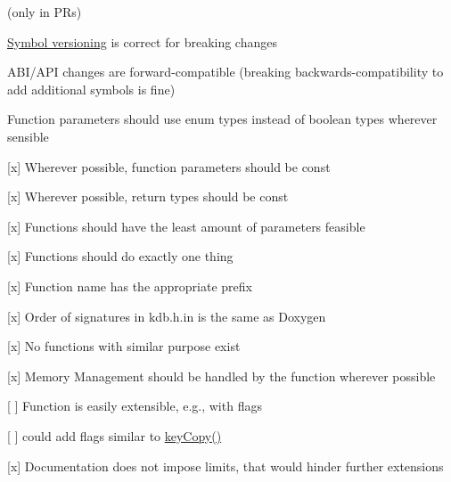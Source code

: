 {\ttfamily }

{\ttfamily  (only in P\+Rs)}

{\ttfamily 
\begin{DoxyItemize}
\item \hyperlink{doc_dev_symbol-versioning_md}{Symbol versioning} is correct for breaking changes
\item A\+B\+I/\+A\+PI changes are forward-\/compatible (breaking backwards-\/compatibility to add additional symbols is fine)
\end{DoxyItemize}}

{\ttfamily }

{\ttfamily 
\begin{DoxyItemize}
\item Function parameters should use enum types instead of boolean types wherever sensible
\item \mbox{[}x\mbox{]} Wherever possible, function parameters should be {\ttfamily const}
\item \mbox{[}x\mbox{]} Wherever possible, return types should be {\ttfamily const}
\item \mbox{[}x\mbox{]} Functions should have the least amount of parameters feasible
\end{DoxyItemize}}

{\ttfamily }

{\ttfamily 
\begin{DoxyItemize}
\item \mbox{[}x\mbox{]} Functions should do exactly one thing
\item \mbox{[}x\mbox{]} Function name has the appropriate prefix
\item \mbox{[}x\mbox{]} Order of signatures in kdb.\+h.\+in is the same as Doxygen
\item \mbox{[}x\mbox{]} No functions with similar purpose exist
\end{DoxyItemize}}

{\ttfamily }

{\ttfamily 
\begin{DoxyItemize}
\item \mbox{[}x\mbox{]} Memory Management should be handled by the function wherever possible
\end{DoxyItemize}}

{\ttfamily }

{\ttfamily 
\begin{DoxyItemize}
\item \mbox{[} \mbox{]} Function is easily extensible, e.\+g., with flags
\begin{DoxyItemize}
\item \mbox{[} \mbox{]} could add flags similar to {\ttfamily \hyperlink{group__key_ga505575ebef060066984fe0f590081e37}{key\+Copy()}}
\end{DoxyItemize}
\item \mbox{[}x\mbox{]} Documentation does not impose limits, that would hinder further extensions
\end{DoxyItemize}}

